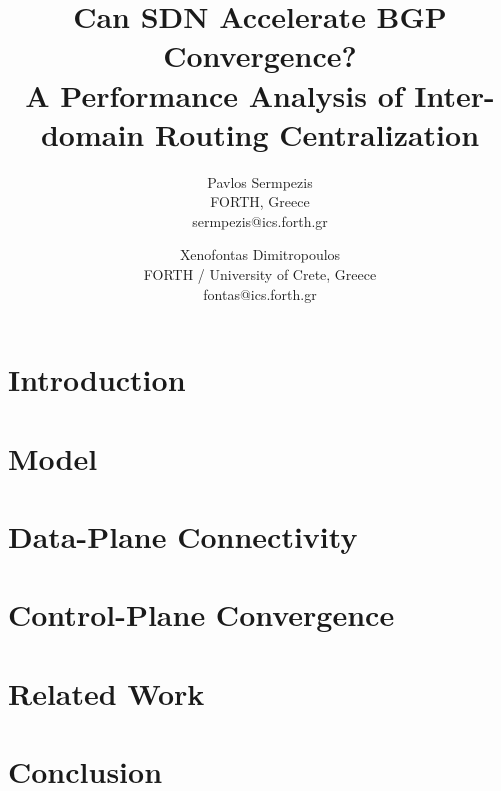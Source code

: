 \documentclass[10pt, conference, letterpaper]{IEEEtran}%
\begin{document}
\title{Can SDN Accelerate BGP Convergence?\\ {\LARGE A Performance Analysis of Inter-domain Routing Centralization}}%
\author{Pavlos Sermpezis\\FORTH, Greece\\sermpezis@ics.forth.gr \and
		Xenofontas Dimitropoulos\\FORTH / University of Crete, Greece\\fontas@ics.forth.gr }
		
		
\maketitle
\begin{abstract}

\end{abstract}

\section{Introduction}\label{sec:intro}


\section{Model}\label{sec:model}


\section{Data-Plane Connectivity}\label{sec:data-plane}


\section{Control-Plane Convergence}\label{sec:control-plane}


\section{Related Work}


\section{Conclusion}\label{sec:conclusion}

\end{document}
